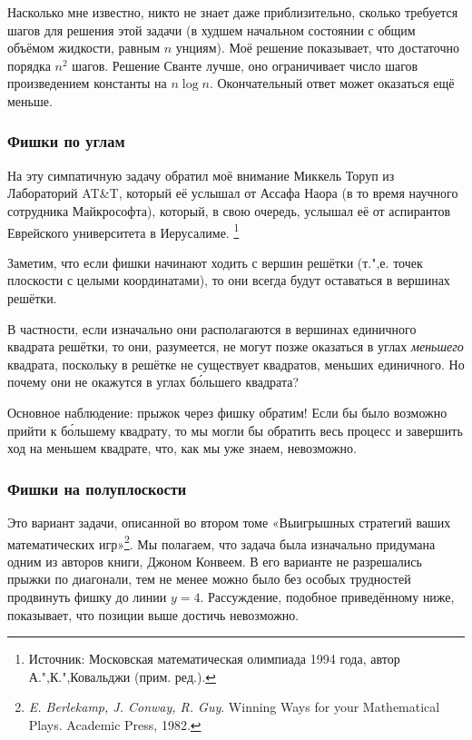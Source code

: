 \documentclass[twoside]{book}
\begin{document}
Насколько мне известно, никто не знает даже приблизительно, сколько требуется шагов для решения этой задачи (в худшем начальном состоянии с общим объёмом жидкости, равным $n$ унциям).
Моё решение показывает, что достаточно порядка $n^2$ шагов.
Решение Сванте лучше, оно ограничивает число шагов произведением константы на $n\log n$.
Окончательный ответ может оказаться ещё меньше.

\subsubsection*{Фишки по углам}%

На эту симпатичную задачу обратил моё внимание Миккель Торуп из Лабораторий AT\&T, %
который её услышал от Ассафа Наора %
(в то время научного сотрудника Майкрософта), который, в свою очередь, услышал её от аспирантов Еврейского университета в Иерусалиме.%
\footnote{Источник: Московская математическая олимпиада 1994 года, автор  А.",К.",Ковальджи \cite[№107751]{problems} (прим. ред.).}


\medskip

Заметим, что если фишки начинают ходить с вершин решётки (т.",е. точек плоскости с целыми координатами), то они всегда будут оставаться в вершинах решётки.

В частности, если изначально они располагаются в вершинах единичного квадрата решётки, то они, разумеется, не могут позже оказаться в углах \emph{меньшего} квадрата, поскольку в решётке не существует квадратов, меньших единичного.
Но почему они не окажутся в углах б\'{о}льшего квадрата?

Основное наблюдение: прыжок через фишку обратим!
Если бы было возможно прийти к б\'{о}льшему квадрату, то мы могли бы обратить весь процесс и завершить ход на меньшем квадрате, что, как мы уже знаем, невозможно.
\heart

\subsubsection*{Фишки на полуплоскости}%

Это вариант задачи, описанной во втором томе «Выигрышных стратегий ваших математических игр»\footnote{\emph{E. Berlekamp, J. Conway, R. Guy}.
{Winning Ways for your Mathematical Plays.} Academic Press, 1982.}.
Мы полагаем, что задача была изначально придумана одним из авторов книги, Джоном Конвеем.
В его варианте не разрешались прыжки по диагонали, тем не менее можно было без особых трудностей продвинуть фишку до линии $y = 4$.
Рассуждение, подобное приведённому ниже, показывает, что позиции выше достичь невозможно.
\end{document}
